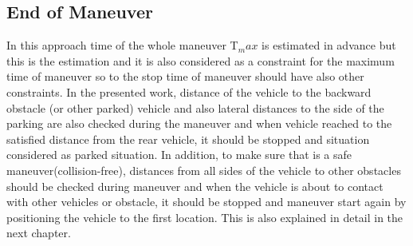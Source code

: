 \subsection{End of Maneuver}
In this approach time of the whole maneuver T$_max$ is estimated in advance but this is the estimation and it is also considered as a constraint for the maximum time of maneuver so to the stop time of maneuver should have also other constraints. In the presented work, distance of the vehicle to the backward obstacle (or other parked) vehicle and also lateral distances to the side of the parking are also checked during the maneuver and when vehicle reached to the satisfied distance from the rear vehicle, it should be stopped and situation considered as parked situation. In addition, to make sure that is a safe maneuver(collision-free), distances from all sides of the vehicle to other obstacles should be checked during maneuver and when the vehicle is about to contact with other vehicles or obstacle, it should be stopped and maneuver start again by positioning the vehicle to the first location. This is also explained in detail in the next chapter.

